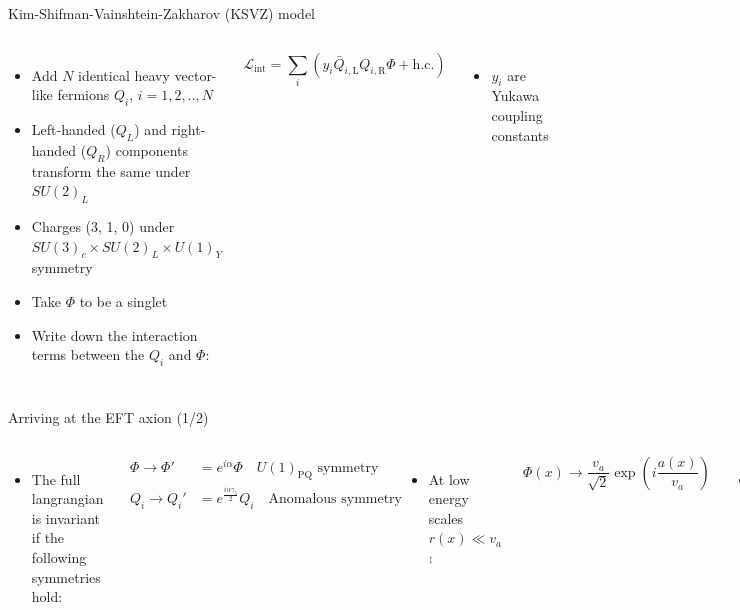 \documentclass[aspectratio=1610, 9pt]{beamer}
\begin{document}
\begin{frame}{Kim-Shifman-Vainshtein-Zakharov (KSVZ) model}
  \begin{columns}
    \column{\textwidth}
    \begin{itemize}
      \item Add $N$ identical heavy vector-like fermions $Q_i$, $i=1,2,..,N$
      \item Left-handed ($Q_L$) and right-handed ($Q_R$) components transform the same under $SU(2)_L$
      \item Charges (3, 1, 0) under $SU(3)_c × SU(2)_L × U(1)_Y$ symmetry
      \item Take $\Phi$ to be a singlet
      \item Write down the interaction terms between the $Q_i$ and $\Phi$:
    \end{itemize}
    \begin{equation*}
      \mathcal{L}_{\text{int}} = \sum_i \left( y_i \bar{Q}_{i \mathrm{,L}} Q_{i \mathrm{,R}} \Phi + \text{h.c.} \right)
    \end{equation*}
    \begin{itemize}
      \item $y_i$ are Yukawa coupling constants
    \end{itemize}
  \end{columns} 
\end{frame}

\begin{frame}{Arriving at the EFT axion (1/2)}
  \begin{columns}
    \column{\textwidth}
    \begin{itemize}
      \item The full langrangian is invariant if the following symmetries hold:
    \end{itemize}
    \begin{align*}
      \Phi \rightarrow \Phi' &= e^{i \alpha} \Phi \quad U(1)_{\mathrm{PQ}} \,\, \text{symmetry} \\
      Q_i \rightarrow Q_i' &= e^{\frac{i \alpha \gamma_5}{2}} Q_i \quad \text{Anomalous symmetry}
    \end{align*}
    \begin{itemize}
      \item At low energy scales $r(x) \ll v_a$:
    \end{itemize}
    \begin{equation*}
      \Phi(x) \rightarrow \frac{v_a}{\sqrt{2}}\exp \left( i\frac{a(x)}{v_a} \right) 
    \end{equation*}
    \begin{itemize}
      \item Substitute into $\mathcal{L}_{\text{int}}$ and define quark masses $m_i = \frac{y_i v_a}{\sqrt{2}}$:
    \end{itemize}
    \begin{equation*}
      \mathcal{L}_{\text{int}} =  \sum_i \left( m_i \bar{Q}_{i \mathrm{,L}} Q_{i \mathrm{,R}} \exp \left( i\frac{a(x)}{v_a} \right) + \text{h.c.} \right)
    \end{equation*}
  \end{columns} 
\end{frame}
\end{document}
